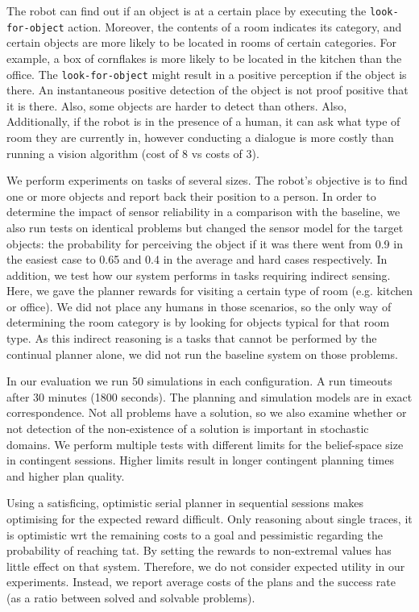 The robot can find out if an object is at a certain place by executing
the {\tt look-for-object} action. Moreover, the contents of a room
indicates its category, and certain objects are more likely to be
located in rooms of certain categories. For example, a box of
cornflakes is more likely to be located in the kitchen than the
office. The {\tt look-for-object} might result in a positive
perception if the object is there. An instantaneous positive detection
of the object is not proof positive that it is there. Also, some
objects are harder to detect than others. Also, Additionally, if the
robot is in the presence of a human, it can ask what type of room they
are currently in, however conducting a dialogue is more costly than
running a vision algorithm (cost of 8 vs costs of 3).

We perform experiments on tasks of several sizes. The robot's
objective is to find one or more objects and report back their
position to a person. In order to determine the impact of sensor
reliability in a comparison with the baseline, we also run tests on
identical problems but changed the sensor model for the target
objects: the probability for perceiving the object if it was there
went from 0.9 in the easiest case to 0.65 and 0.4 in the average and
hard cases respectively. In addition, we test how our system performs
in tasks requiring indirect sensing. Here, we gave the planner rewards
for visiting a certain type of room (e.g. kitchen or office). We did
not place any humans in those scenarios, so the only way of
determining the room category is by looking for objects typical for
that room type. As this indirect reasoning is a tasks that cannot be
performed by the continual planner alone, we did not run the baseline
system on those problems.



In our evaluation we run 50 simulations in each configuration. A run
timeouts after 30 minutes (1800 seconds). The planning and simulation
models are in exact correspondence. Not all problems have a solution,
so we also examine whether or not detection of the non-existence of a
solution is important in stochastic domains.
We perform multiple tests with different limits for the
belief-space size in contingent sessions.  Higher limits result in
longer contingent planning times and higher plan quality.


Using a satisficing, optimistic serial planner in sequential sessions
makes optimising for the expected reward difficult. Only reasoning
about single traces, it is optimistic wrt the remaining costs to a
goal and pessimistic regarding the probability of reaching tat. By
setting the rewards to non-extremal values has little effect on that
system. Therefore, we do not consider expected utility in our
experiments. Instead, we report average costs of the plans and the
success rate (as a ratio between solved and solvable problems).


